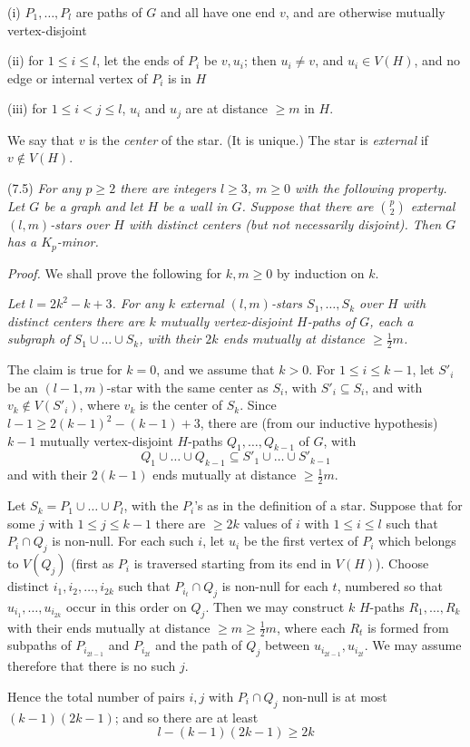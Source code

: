 \hspace*{12pt}(i) $P_1, \dots, P_l$ are paths of $G$ and all have one end $v$, and are otherwise mutually vertex-disjoint

\hspace*{12pt}(ii) for $1 \le i \le l$, let the ends of $P_i$ be $v, u_i$; then $u_i \ne v$, and $u_i \in V(H)$, and no edge or internal vertex of $P_i$ is in $H$

\hspace*{12pt}(iii) for $1 \le i < j \le l$, $u_i$ and $u_j$ are at distance $\ge m$ in $H$.

We say that $v$ is the \textit{center} of the star. (It is unique.) The star is \textit{external} if $v \notin V(H)$.

\stmt
(7.5) \textit{For any $p \ge 2$ there are integers $l \ge 3$, $m \ge 0$ with the following property. Let $G$ be a graph and let $H$ be a wall in $G$. Suppose that there are $\binom{p}{2}$ external $(l, m)$-stars over $H$ with distinct centers (but not necessarily disjoint). Then $G$ has a $K_p$-minor.}

\textit{Proof.} We shall prove the following for $k, m \ge 0$ by induction on $k$.

\textit{Let $l = 2k^2 - k + 3$. For any $k$ external $(l, m)$-stars $S_1, \dots, S_k$ over $H$ with distinct centers there are $k$ mutually vertex-disjoint $H$-paths of $G$, each a subgraph of $S_1 \cup \dots \cup S_k$, with their $2k$ ends mutually at distance $\ge \frac{1}{2}m$.}

The claim is true for $k = 0$, and we assume that $k > 0$. For $1 \le i \le k - 1$, let $S'_i$ be an $(l - 1, m)$-star with the same center as $S_i$, with $S'_i \subseteq S_i$, and with $v_k \notin V(S'_i)$, where $v_k$ is the center of $S_k$. Since $l - 1 \ge 2(k - 1)^2 - (k - 1) + 3$, there are (from our inductive hypothesis) $k - 1$ mutually vertex-disjoint $H$-paths $Q_1, \dots, Q_{k - 1}$ of $G$, with
\begin{equation*}
Q_1 \cup \dots \cup Q_{k - 1} \subseteq S'_1 \cup \dots \cup S'_{k - 1}
\end{equation*}
and with their $2(k - 1)$ ends mutually at distance $\ge \frac{1}{2}m$.

Let $S_k = P_1 \cup \dots \cup P_l$, with the $P_i$'s as in the definition of a star. Suppose that for some $j$ with $1 \le j \le k - 1$ there are $\ge 2k$ values of $i$ with $1 \le i \le l$ such that $P_i \cap Q_j$ is non-null. For each such $i$, let $u_i$ be the first vertex of $P_i$ which belongs to $V(Q_j)$ (first as $P_i$ is traversed starting from its end in $V(H)$). Choose distinct $i_1, i_2, \dots, i_{2k}$ such that $P_{i_t} \cap Q_j$ is non-null for each $t$, numbered so that $u_{i_1}, \dots, u_{i_{2k}}$ occur in this order on $Q_j$. Then we may construct $k$ $H$-paths $R_1, \dots, R_k$ with their ends mutually at distance $\ge m \ge \frac{1}{2}m$, where each $R_t$ is formed from subpaths of $P_{i_{2t - 1}}$ and $P_{i_{2t}}$ and the path of $Q_j$ between $u_{i_{2t - 1}}, u_{i_{2t}}$. We may assume therefore that there is no such $j$.

Hence the total number of pairs $i, j$ with $P_i \cap Q_j$ non-null is at most $(k - 1)(2k - 1)$; and so there are at least
\begin{equation*}
l - (k - 1)(2k - 1) \ge 2k
\end{equation*}
